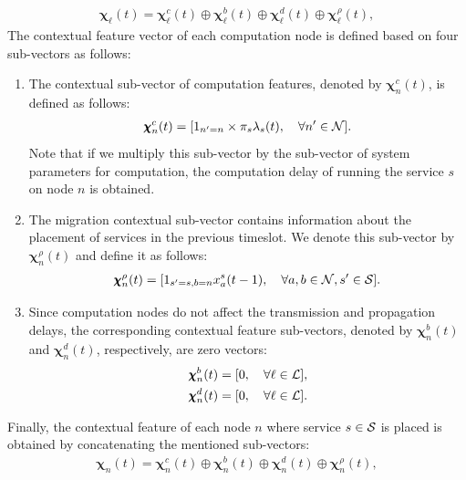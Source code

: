 \begin{gather}
	\pmb{\chi}_{\ell}(t) = \pmb{\chi}_{\ell}^{c}(t) \oplus \pmb{\chi}_{\ell}^{b}(t) \oplus \pmb{\chi}_{\ell}^{d}(t) \oplus \pmb{\chi}_{\ell}^{\rho}(t), 
\end{gather}
The contextual feature vector of each computation node is defined based on four sub-vectors as follows:
\begin{enumerate}[leftmargin=*]
	\item The contextual sub-vector of computation features, denoted by $\pmb{\chi}_{n}^{c}(t)$, is defined as follows: 
	\begin{gather}
		\pmb{\chi}_{n}^{c}(t) = [1_{n'=n}\times \pi_{s}\lambda_{s}(t), \quad \forall n'\in\mathcal{N}].
	\end{gather}
	Note that if we multiply this sub-vector by the sub-vector of system parameters for computation, the computation delay of running the service $s$ on node $n$ is obtained.
	\item The migration contextual sub-vector contains information about the placement of services in the previous timeslot.  We denote this sub-vector by $\pmb{\chi}_{n}^{\rho}(t)$ and define it as follows:
	\begin{gather}
		\pmb{\chi}_{n}^{\rho}(t) = [1_{s'=s,b=n}x_{a}^{s}(t-1), \quad \forall a,b\in\mathcal{N}, s'\in\mathcal{S}].
	\end{gather}
	\item Since computation nodes do not affect the transmission and propagation delays, the corresponding contextual feature sub-vectors, denoted by $\pmb{\chi}_{n}^{b}(t)$ and $\pmb{\chi}_{n}^{d}(t)$, respectively, are zero vectors: 
	\begin{gather}
		\pmb{\chi}_{n}^{b}(t) = [0, \quad \forall \ell\in\mathcal{L}], \\
		\pmb{\chi}_{n}^{d}(t) = [0, \quad \forall \ell\in\mathcal{L}].
	\end{gather}
\end{enumerate}
Finally, the contextual feature of each node $n$ where service $s\in\mathcal{S}$ is placed is obtained by concatenating the mentioned sub-vectors:
\begin{gather}
	\pmb{\chi}_{n}(t) = \pmb{\chi}_{n}^{c}(t) \oplus \pmb{\chi}_{n}^{b}(t) \oplus \pmb{\chi}_{n}^{d}(t) \oplus \pmb{\chi}_{n}^{\rho}(t), 
\end{gather}


